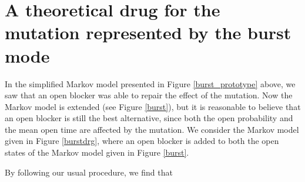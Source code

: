 


\section[Theoretical drug for the burst mode model]{A theoretical drug for the
mutation represented by the burst mode}

 In the simplified Markov model presented in Figure \ref{burst_prototype} above, we saw
that an open blocker was able to repair the effect of the mutation.
Now the Markov model is extended (see Figure \ref{burst}), but it is reasonable to
believe that an open blocker is still the best alternative, since both the open
probability and the mean open time are affected by the mutation. We consider
the Markov model given in Figure \ref{burstdrg}, where an open blocker is added to both
the open states of the Markov model given in Figure \ref{burst}. 
\begin{comment}
The equilibrium state
of the Markov model given in Figure \ref{burstdrg} is characterized by%
\begin{equation}%
\begin{array}
[c]{ccc}%
k_{ci}c_{0}=k_{ic}i, & k_{oi}o=k_{io}i, & k_{co}c_{0}=k_{oc}o,\\
3\beta c_{0}=\alpha c_{1}, & 2\alpha c_{2}=2\beta c_{1}, & 3\alpha c_{3}=\beta
c_{2},\\
k^{u}o^{\ast}=\mu k^{d}o, & k^{u}c_{0}^{\ast}=\mu k^{d}c_{0}, & k^{u}%
c_{1}^{\ast}=\mu k^{d}c_{1},\\
k^{u}c_{2}^{\ast}=\mu k^{d}c_{2}, & k^{u}c_{3}^{\ast}=\mu k^{d}c_{3}, & \\
k_{ob}o=k_{bo}b, & k_{ob}o^{\ast}=k_{bo}b^{\ast}. &
\end{array}
\end{equation}
\end{comment}
By following our usual procedure, we find that%
\begin{comment}
\begin{align*}
i &  =\frac{k_{oi}}{k_{io}}o,\text{ }c_{0}=\frac{k_{oc}}{k_{co}}o,\text{ }\\
c_{1} &  =\frac{3\beta}{\alpha}\frac{k_{oc}}{k_{co}}o,\text{ }c_{2}%
=\frac{3\beta^{2}}{\alpha^{2}}\frac{k_{oc}}{k_{co}}o,\text{ }c_{3}=\frac
{\beta^{3}}{\alpha^{3}}\frac{k_{oc}}{k_{co}}o,\\
o^{\ast} &  =\mu\frac{k^{d}}{k^{u}}o,c_{0}^{\ast}=\mu\frac{k^{d}}{k^{u}}%
\frac{k_{oc}}{k_{co}}o,c_{1}^{\ast}=\mu\frac{3\beta}{\alpha}\frac{k^{d}}%
{k^{u}}\frac{k_{oc}}{k_{co}}o,\\
c_{2}^{\ast} &  =\mu\frac{3\beta^{2}}{\alpha^{2}}\frac{k^{d}}{k^{u}}%
\frac{k_{oc}}{k_{co}}o,c_{3}^{\ast}=\mu\frac{\beta^{3}}{\alpha^{3}}\frac
{k^{d}}{k^{u}}\frac{k_{oc}}{k_{co}}o,\\
b &  =\frac{k_{ob}}{k_{bo}}o,b^{\ast}=\mu\frac{k_{ob}}{k_{bo}}\frac{k^{d}%
}{k^{u}}o,
\end{align*}
\newline and, since the sum of the probabilities equals one, we have
\end{comment}
